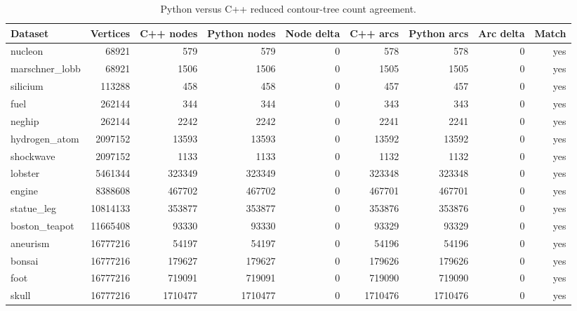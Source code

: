 \begin{table}[htbp]
\centering
\small
\caption{Python versus C++ reduced contour-tree count agreement.}
\label{tab:python-cpp-agreement}
\begin{tabular}{lrrrrrrrr}
\hline
Dataset & Vertices & C++ nodes & Python nodes & Node delta & C++ arcs & Python arcs & Arc delta & Match \\
\hline
nucleon & 68921 & 579 & 579 & 0 & 578 & 578 & 0 & yes \\
marschner\_lobb & 68921 & 1506 & 1506 & 0 & 1505 & 1505 & 0 & yes \\
silicium & 113288 & 458 & 458 & 0 & 457 & 457 & 0 & yes \\
fuel & 262144 & 344 & 344 & 0 & 343 & 343 & 0 & yes \\
neghip & 262144 & 2242 & 2242 & 0 & 2241 & 2241 & 0 & yes \\
hydrogen\_atom & 2097152 & 13593 & 13593 & 0 & 13592 & 13592 & 0 & yes \\
shockwave & 2097152 & 1133 & 1133 & 0 & 1132 & 1132 & 0 & yes \\
lobster & 5461344 & 323349 & 323349 & 0 & 323348 & 323348 & 0 & yes \\
engine & 8388608 & 467702 & 467702 & 0 & 467701 & 467701 & 0 & yes \\
statue\_leg & 10814133 & 353877 & 353877 & 0 & 353876 & 353876 & 0 & yes \\
boston\_teapot & 11665408 & 93330 & 93330 & 0 & 93329 & 93329 & 0 & yes \\
aneurism & 16777216 & 54197 & 54197 & 0 & 54196 & 54196 & 0 & yes \\
bonsai & 16777216 & 179627 & 179627 & 0 & 179626 & 179626 & 0 & yes \\
foot & 16777216 & 719091 & 719091 & 0 & 719090 & 719090 & 0 & yes \\
skull & 16777216 & 1710477 & 1710477 & 0 & 1710476 & 1710476 & 0 & yes \\
\hline
\end{tabular}
\end{table}
